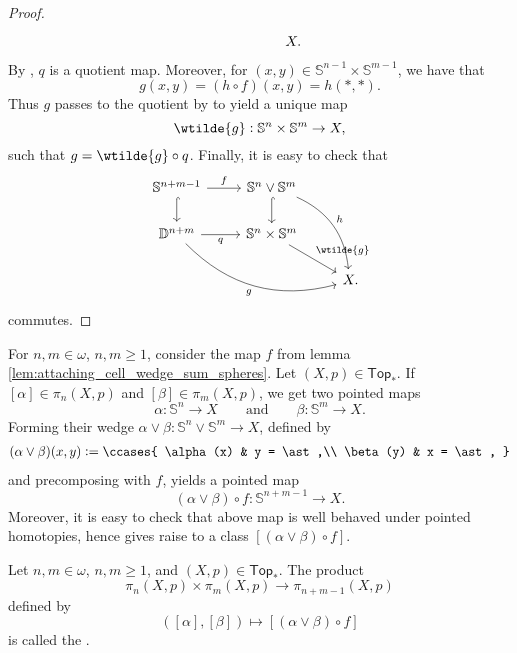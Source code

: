 \begin{proof}
\begin{equation*}
\begin{tikzcd}
			& & X.
		\end{tikzcd}
	\end{equation*}
	By \cite[186]{munkres:topology:2000}, $q$ is a quotient map. Moreover, for $(x,y) \in \mathbb{S}^{n - 1} \times \mathbb{S}^{m - 1}$, we have that
	\begin{equation*}
		g(x,y) = (h \circ f)(x,y) = h(\ast,\ast).
	\end{equation*}
	Thus $g$ passes to the quotient by \cite[72]{lee:topological_manifolds:2011} to yield a unique map
	\begin{equation*}
		\wtilde{g} : \mathbb{S}^n \times \mathbb{S}^m \to X,
	\end{equation*}
	\noindent such that $g = \wtilde{g} \circ q$. Finally, it is easy to check that
	\begin{equation*}
		\begin{tikzcd}
			\mathbb{S}^{n + m - 1} \arrow[r,"f"]\arrow[d,hook] & \mathbb{S}^n \vee \mathbb{S}^m \arrow[d,hook]\arrow[ddr,bend left,"h"]\\
			\mathbb{D}^{n + m} \arrow[r,"q"']\arrow[drr,bend right,"g"'] & \mathbb{S}^n \times \mathbb{S}^m\arrow[dr,"\wtilde{g}"]\\
			& & X.
		\end{tikzcd}
	\end{equation*}
	\noindent commutes.
\end{proof}

For $n,m \in \omega$, $n,m \geq 1$, consider the map $f$ from lemma \ref{lem:attaching_cell_wedge_sum_spheres}. Let $(X,p) \in \mathsf{Top}_*$. If $[\alpha] \in \pi_n(X,p)$ and $[\beta] \in \pi_m(X,p)$, we get two pointed maps
\begin{equation*}
	\alpha : \mathbb{S}^n \to X \qquad \text{and} \qquad \beta : \mathbb{S}^m \to X.
\end{equation*}
Forming their wedge $\alpha \vee \beta : \mathbb{S}^n \vee \mathbb{S}^m \to X$, defined by
\begin{align*}
	(\alpha \vee \beta) (x,y) := \ccases{
		\alpha(x) & y = \ast,\\
		\beta(y) & x = \ast,
	}
\end{align*}
\noindent and precomposing with $f$, yields a pointed map
\begin{equation*}
	(\alpha \vee \beta) \circ f : \mathbb{S}^{n + m - 1} \to X.
\end{equation*}
Moreover, it is easy to check that above map is well behaved under pointed homotopies, hence gives raise to a class $[(\alpha \vee \beta) \circ f]$.

\begin{definition}
	Let $n,m \in \omega$, $n,m \geq 1$, and $(X,p) \in \mathsf{Top}_\ast$. The product
	\begin{equation*}
		\pi_n(X,p) \times \pi_m(X,p) \to \pi_{n + m - 1}(X,p)
	\end{equation*}
	\noindent defined by
	\begin{equation*}
		([\alpha],[\beta]) \mapsto [(\alpha \vee \beta) \circ f]
	\end{equation*}
	\noindent is called the .
\end{definition}

